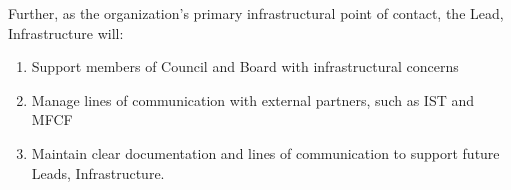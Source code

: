 Further, as the organization's primary infrastructural point of contact, the Lead, Infrastructure will:
\begin{enumerate}
  \item Support members of Council and Board with infrastructural concerns
  \item Manage lines of communication with external partners, such as IST and MFCF 
  \item Maintain clear documentation and lines of communication to support future Leads, Infrastructure.
\end{enumerate}


